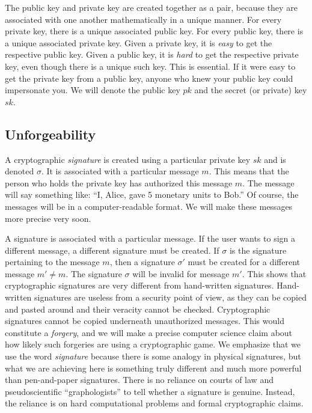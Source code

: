 The public key and private key are created together as a pair, because they are associated
with one another mathematically in a unique manner. For every private key, there is a unique
associated public key. For every public key, there is a unique associated private key.
Given a private key, it is \emph{easy} to get the respective public key. Given a public
key, it is \emph{hard} to get the respective private key, even though there is a unique
such key. This is essential. If it were easy to get the private key from a public key,
anyone who knew your public key could impersonate you. We will denote the public key
%
$pk$
and the secret (or private) key
%
$sk$.

\subsection*{Unforgeability}

A cryptographic \emph{signature} is created using a particular private key $sk$ and is
denoted
%
$\sigma$.
It is associated with a particular message $m$. This means that
the person who holds the private key has authorized this message $m$. The message
will say something like: ``I, Alice, gave 5 monetary units to Bob.'' Of course, the
messages will be in a computer-readable format. We will make these messages more
precise very soon.

A signature is associated with a particular message. If the user wants to sign a
different message, a different signature must be created. If $\sigma$ is the signature
pertaining to the message $m$, then a signature $\sigma'$ must be created for a
different message $m' \neq m$. The signature $\sigma$ will be invalid for message $m'$.
This shows that cryptographic signatures are very different from hand-written signatures.
Hand-written signatures are useless from a security point of view, as they can be
copied and pasted around and their veracity cannot be checked. Cryptographic
signatures cannot be copied underneath unauthorized messages. This would constitute
a \emph{forgery}, and we will make a precise computer science claim about how
likely such forgeries are using a cryptographic game. We emphasize that we use the
word \emph{signature} because there is some analogy in physical signatures, but
what we are achieving here is something truly different and much more powerful
than pen-and-paper signatures. There is no reliance on courts of law and pseudoscientific
``graphologists'' to tell whether a signature is genuine. Instead, the reliance is
on hard computational problems and formal cryptographic claims.

